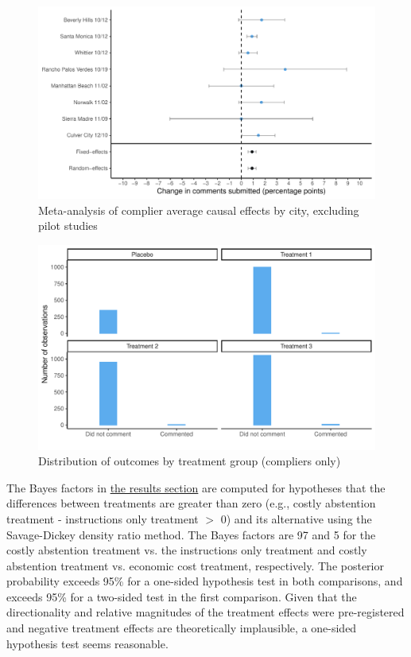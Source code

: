 \documentclass[12pt,final,fleqn]{article}
\theoremstyle{plain}
\begin{document}



\label{tab: pml}

\begin{figure}[!htb]
\includegraphics[width = \textwidth]{../figs/fgA8.pdf}
\caption{Meta-analysis of complier average causal effects by city, excluding pilot studies}
\label{fig: meta_nopilot}
\end{figure}

\begin{figure}[!htb]
\includegraphics[width = \textwidth]{../figs/fgA9.pdf}
\caption{Distribution of outcomes by treatment group (compliers only)}
\label{fig: outcomes}
\end{figure}

\clearpage

The Bayes factors in \hyperref[sec: results_group]{the results section} are computed for hypotheses that the differences between treatments are greater than zero (e.g., costly abstention treatment - instructions only treatment $>$ 0) and its alternative using the Savage-Dickey density ratio method. The Bayes factors are 97 and 5 for the costly abstention treatment vs. the instructions only treatment and costly abstention treatment vs. economic cost treatment, respectively. The posterior probability exceeds 95\% for a one-sided hypothesis test in both comparisons, and exceeds 95\% for a two-sided test in the first comparison. Given that the directionality and relative magnitudes of the treatment effects were pre-registered and negative treatment effects are theoretically implausible, a one-sided hypothesis test seems reasonable. 
\end{document}
